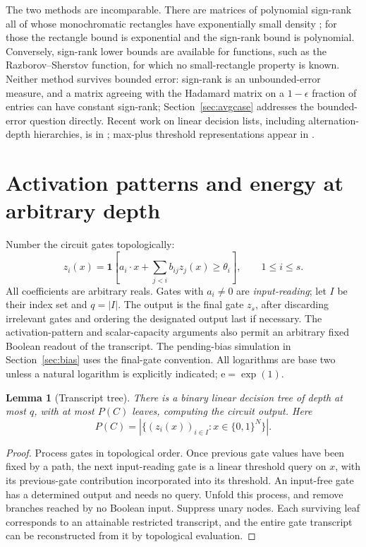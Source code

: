 \documentclass[11pt]{article}
\newtheorem{lemma}[theorem]{Lemma}
\theoremstyle{definition}
\newcommand{\bits}{\{0,1\}}
\newcommand{\ind}[1]{\mathbf 1[#1]}
\newcommand{\Eul}{\mathrm e}
\begin{document}
The two methods are incomparable. There are matrices of polynomial sign-rank all of whose monochromatic rectangles have exponentially small density \cite{Sherstov08}; for those the rectangle bound is exponential and the sign-rank bound is polynomial. Conversely, sign-rank lower bounds are available for functions, such as the Razborov--Sherstov function, for which no small-rectangle property is known. Neither method survives bounded error: sign-rank is an unbounded-error measure, and a matrix agreeing with the Hadamard matrix on a \(1-\epsilon\) fraction of entries can have constant sign-rank; Section~\ref{sec:avgcase} addresses the bounded-error question directly. Recent work on linear decision lists, including alternation-depth hierarchies, is in \cite{PP26}; max-plus threshold representations appear in \cite{HP13}.

\section{Activation patterns and energy at arbitrary depth}\label{sec:energy}
Number the circuit gates topologically:
\[
 z_i(x)=\ind{a_i\cdot x+\sum_{j<i}b_{ij}z_j(x)\ge\theta_i},
 \qquad 1\le i\le s.                                    \tag{3}
\]
All coefficients are arbitrary reals. Gates with \(a_i\ne0\) are \emph{input-reading}; let \(I\) be their index set and \(q=|I|\).
The output is the final gate \(z_s\), after discarding irrelevant gates and ordering the designated output last if necessary. The activation-pattern and scalar-capacity arguments also permit an arbitrary fixed Boolean readout of the transcript. The pending-bias simulation in Section~\ref{sec:bias} uses the final-gate convention.
All logarithms are base two unless a natural logarithm is explicitly indicated; \(\Eul=\exp(1)\).

\begin{lemma}[Transcript tree]\label{lem:transcript}
There is a binary linear decision tree of depth at most \(q\), with at most \(P(C)\) leaves, computing the circuit output. Here
\[
 P(C)=|\{(z_i(x))_{i\in I}:x\in\bits^N\}|.
\]
\end{lemma}
\begin{proof}
Process gates in topological order. Once previous gate values have been fixed by a path, the next input-reading gate is a linear threshold query on \(x\), with its previous-gate contribution incorporated into its threshold. An input-free gate has a determined output and needs no query. Unfold this process, and remove branches reached by no Boolean input. Suppress unary nodes. Each surviving leaf corresponds to an attainable restricted transcript, and the entire gate transcript can be reconstructed from it by topological evaluation.
\end{proof}
\end{document}

